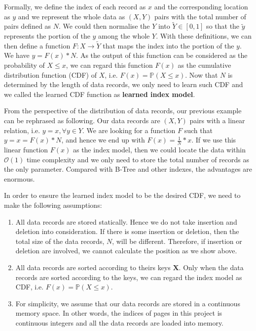 
Formally, we define the index of each record as $x$ and the corresponding location as $y$ and we represent the whole data as $(X, Y)$ pairs with the total number of pairs defined as $N$. We could then normalise the $Y$ into $\tilde{Y}\in[0,1]$ so that the $\tilde{y}$ represents the portion of the $y$ among the whole $Y$. With these definitions, we can then define a function $F:X\to \tilde{Y}$ that maps the index into the portion of the $y$. We have $y=F(x)* N$. As the output of this function can be considered as the probability of $X\leq x$, we can regard this function $F(x)$ as the cumulative distribution function (CDF) of $X$, i.e. $F(x)=\mathbb{P}(X\leq x)$. Now that $N$ is determined by the length of data records, we only need to learn such CDF and we called the learned CDF function as \textbf{learned index model}.

\begin{mscexample}
	From the perspective of the distribution of data records, our previous example can be rephrased as following. Our data records are $(X, Y)$ pairs with a linear relation, i.e. $y=x, \forall y\in Y$. We are looking for a function $F$ such that $y=x=F(x)* N$, and hence we end up with $F(x)=\frac{1}{N}*x$. If we use this linear function $F(x)$ as the index model, then we could locate the data within $\mathcal{O}(1)$ time complexity and we only need to store the total number of records as the only parameter. Compared with B-Tree and other indexes, the advantages are enormous.
\end{mscexample}

In order to ensure the learned index model to be the desired CDF, we need to make the following assumptions:

\begin{enumerate}
	\item All data records are stored statically. Hence we do not take insertion and deletion into consideration. If there is some insertion or deletion, then the total size of the data records, $N$, will be different. Therefore, if insertion or deletion are involved, we cannot calculate the position as we show above.
	\item All data records are sorted according to theirs keys $\boldsymbol{X}$. Only when the data records are sorted according to the keys, we can regard the index model as CDF, i.e. $F(x)=\mathbb{P}(X\leq x)$.
	\item For simplicity, we assume that our data records are stored in a continuous memory space. In other words, the indices of pages in this project is continuous integers and all the data records are loaded into memory.
\end{enumerate}